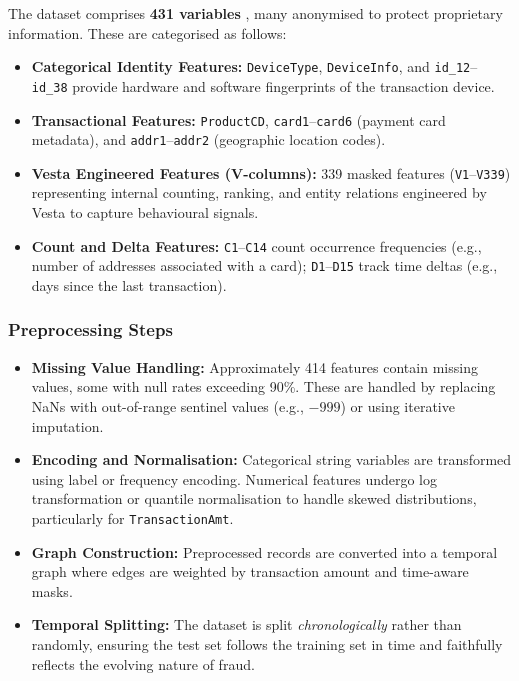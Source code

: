 \documentclass[12pt, a4paper]{article}
\begin{document}
The dataset comprises \textbf{431 variables} \cite{ieeecisanalysis2024}, many anonymised to protect proprietary information. These are categorised as follows:
 
\begin{itemize}[leftmargin=2em, itemsep=3pt]
  \item \textbf{Categorical Identity Features:} \texttt{DeviceType}, \texttt{DeviceInfo}, and \texttt{id\_12}--\texttt{id\_38} provide hardware and software fingerprints of the transaction device.
  \item \textbf{Transactional Features:} \texttt{ProductCD}, \texttt{card1}--\texttt{card6} (payment card metadata), and \texttt{addr1}--\texttt{addr2} (geographic location codes).
  \item \textbf{Vesta Engineered Features (V-columns):} 339 masked features (\texttt{V1}--\texttt{V339}) representing internal counting, ranking, and entity relations engineered by Vesta to capture behavioural signals.
  \item \textbf{Count and Delta Features:} \texttt{C1}--\texttt{C14} count occurrence frequencies (e.g., number of addresses associated with a card); \texttt{D1}--\texttt{D15} track time deltas (e.g., days since the last transaction).
\end{itemize}
 
\subsubsection*{Preprocessing Steps}
 
\begin{itemize}[leftmargin=2em, itemsep=3pt]
  \item \textbf{Missing Value Handling:} Approximately 414 features contain missing values, some with null rates exceeding 90\%. These are handled by replacing NaNs with out-of-range sentinel values (e.g., $-999$) or using iterative imputation.
  \item \textbf{Encoding and Normalisation:} Categorical string variables are transformed using label or frequency encoding. Numerical features undergo log transformation or quantile normalisation to handle skewed distributions, particularly for \texttt{TransactionAmt}.
  \item \textbf{Graph Construction:} Preprocessed records are converted into a temporal graph where edges are weighted by transaction amount and time-aware masks.
  \item \textbf{Temporal Splitting:} The dataset is split \textit{chronologically} rather than randomly, ensuring the test set follows the training set in time and faithfully reflects the evolving nature of fraud.
\end{itemize}
 
\end{document}
